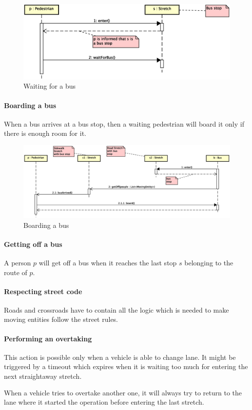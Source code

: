 \begin{figure}[H]
  \centering
  \includegraphics[width=\columnwidth,trim=1 0 2 0,clip]
    {images/solution/bus_waiting.eps}
  \caption{Waiting for a bus}
  \label{fig:app-inter-wait-bus}
\end{figure}

\paragraph{Boarding a bus}
When a bus arrives at a bus stop, then a waiting pedestrian will board it only
if there is enough room for it.

\begin{figure}[H]
  \centering
  \includegraphics[width=\columnwidth,trim=1 0 0 0,clip]
    {images/solution/bus_boarding.eps}
  \caption{Boarding a bus}
  \label{fig:app-inter-board-bus}
\end{figure}

\paragraph{Getting off a bus} A person $p$ will get off a bus when it reaches
the last stop $s$ belonging to the route of $p$.

\paragraph{Respecting street code} Roads and crossroads have to contain
all the logic which is needed to make moving entities follow the street rules.

\paragraph{Performing an overtaking} This action is possible only when a
vehicle is able to change lane. It might be triggered by a timeout which
expires when it is waiting too much for entering the next straightaway stretch.

When a vehicle tries to overtake another one, it will always try to return to
the lane where it started the operation before entering the last stretch.

